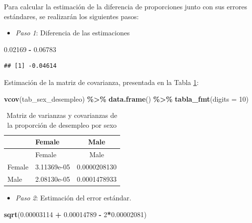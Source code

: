 \documentclass[
  spanish,
  12pt,
]{book}
\newenvironment{Shaded}{\begin{snugshade}}{\end{snugshade}}
\newcommand{\AttributeTok}[1]{\textcolor[rgb]{0.13,0.29,0.53}{#1}}
\newcommand{\DecValTok}[1]{\textcolor[rgb]{0.00,0.00,0.81}{#1}}
\newcommand{\FloatTok}[1]{\textcolor[rgb]{0.00,0.00,0.81}{#1}}
\newcommand{\FunctionTok}[1]{\textcolor[rgb]{0.13,0.29,0.53}{\textbf{#1}}}
\newcommand{\NormalTok}[1]{#1}
\newcommand{\SpecialCharTok}[1]{\textcolor[rgb]{0.81,0.36,0.00}{\textbf{#1}}}
\providecommand{\tightlist}{%
  \setlength{\itemsep}{0pt}\setlength{\parskip}{0pt}}
\begin{document}
Para calcular la estimación de la diferencia de proporciones junto con sus errores estándares, se realizarán los siguientes pasos:

\begin{itemize}
\tightlist
\item
  \emph{Paso 1}: Diferencia de las estimaciones
\end{itemize}

\begin{Shaded}
\begin{Highlighting}[]
\FloatTok{0.02169} \SpecialCharTok{{-}} \FloatTok{0.06783}   
\end{Highlighting}
\end{Shaded}

\begin{verbatim}
## [1] -0.04614
\end{verbatim}

Estimación de la matriz de covarianza, presentada en la Tabla \ref{tab:tab-vcov-sex-desempleo}:

\begin{Shaded}
\begin{Highlighting}[]
\FunctionTok{vcov}\NormalTok{(tab\_sex\_desempleo) }\SpecialCharTok{\%\textgreater{}\%}
  \FunctionTok{data.frame}\NormalTok{() }\SpecialCharTok{\%\textgreater{}\%}
  \FunctionTok{tabla\_fmt}\NormalTok{(}\AttributeTok{digits =} \DecValTok{10}\NormalTok{)}
\end{Highlighting}
\end{Shaded}

\begin{longtable}[]{@{}llc@{}}
\caption{\label{tab:tab-vcov-sex-desempleo}Matriz de varianzas y covarianzas de la proporción de desempleo por sexo}\tabularnewline
\toprule\noalign{}
& Female & Male \\
\midrule\noalign{}
\endfirsthead
\toprule\noalign{}
& Female & Male \\
\midrule\noalign{}
\endhead
\bottomrule\noalign{}
\endlastfoot
Female & 3.11369e-05 & 0.0000208130 \\
Male & 2.08130e-05 & 0.0001478933 \\
\end{longtable}

\begin{itemize}
\tightlist
\item
  \emph{Paso 2}: Estimación del error estándar.
\end{itemize}

\begin{Shaded}
\begin{Highlighting}[]
\FunctionTok{sqrt}\NormalTok{(}\FloatTok{0.00003114}  \SpecialCharTok{+} \FloatTok{0.00014789} \SpecialCharTok{{-}} \DecValTok{2}\SpecialCharTok{*}\FloatTok{0.00002081}\NormalTok{)}
\end{Highlighting}
\end{Shaded}
\end{document}
